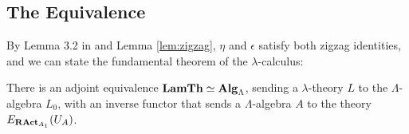 \subsection{The Equivalence}

By Lemma 3.2 in \autocite{nlab:adjoint_equivalence} and Lemma \ref{lem:zigzag}, $ \eta $ and $ \epsilon $ satisfy both zigzag identities, and we can state the fundamental theorem of the $ \lambda $-calculus:
\begin{theorem}\label{thm:Hyland-fundamental-theorem}
  There is an adjoint equivalence $ \mathbf{LamTh} \simeq \mathbf{Alg}_{\Lambda} $, sending a $ \lambda $-theory $ L $ to the $ \Lambda $-algebra $ L_0 $, with an inverse functor that sends a $ \Lambda $-algebra $ A $ to the theory $ E_{\mathbf{RAct}_{A_1}}(U_A) $.
\end{theorem}

